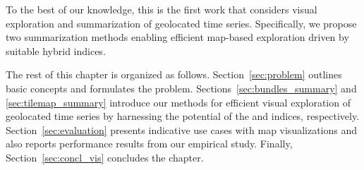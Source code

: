 To the best of our knowledge, this is the first work that considers visual exploration and summarization of geolocated time series. Specifically, we propose two summarization methods enabling efficient map-based exploration driven by suitable hybrid indices.

The rest of this chapter is organized as follows. Section~\ref{sec:problem} outlines basic concepts and formulates the problem. Sections~\ref{sec:bundles_summary} and \ref{sec:tilemap_summary} introduce our methods for efficient visual exploration of geolocated time series by harnessing the potential of the \btsr and \hisax indices, respectively. Section~\ref{sec:evaluation} presents indicative use cases with map visualizations and also reports performance results from our empirical study. Finally, Section~\ref{sec:concl_vis} concludes the chapter.